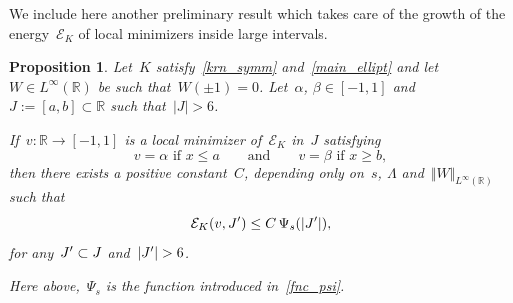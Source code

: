 \documentclass[10pt,a4paper]{amsart}
\newtheorem{prop}[theorem]{Proposition}
\numberwithin{equation}{section}
\newcommand{\R}{\mathbb{R}}
\newcommand{\Ec}{\mathcal{E}_K}
\begin{document}
We include  here another preliminary result which takes care of the growth of the energy~$\Ec$ of local minimizers inside large intervals.

\begin{prop}\label{mdss}
Let~$K$ satisfy~\eqref{krn_symm} and~\eqref{main_ellipt} and let~$W \in L^{\infty}(\R)$ be such that~$W(\pm1)=0$. Let~$\alpha$, $\beta \in [-1,1]$ and~$J:=[a,b] \subset \R$ such that~$|J|>6$.

If~$v:\R \to [-1,1]$ is a local minimizer of~$\Ec$ in~$J$ satisfying 
\begin{equation*}
v=\alpha \mbox{ if } x\leq a \qquad\mbox{and}\qquad v=\beta \mbox{ if } x\geq b,
\end{equation*}
then there exists a positive constant~$C$, depending only on~$s$, $\Lambda$ and~$\Vert W \Vert_{L^{\infty}(\R)}$ such that
\begin{equation*}
\Ec(v, J\rq{})\leq  C \, \Psi_s(| J\rq{} |),
\end{equation*}
for any~$J\rq{} \subset J$ and~$| J\rq{}|>6$.

Here above,~$\Psi_s$ is the function introduced in~\eqref{fnc_psi}.
\end{prop}
\end{document}
